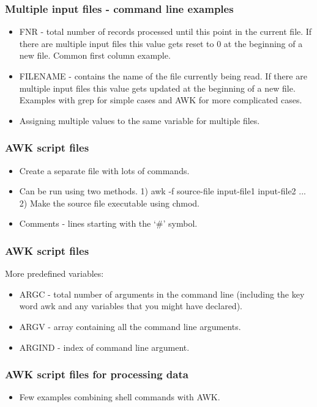 \documentclass[xcolor=svgnames]{beamer}
\begin{document}
\begin{frame}
    \frametitle{Multiple input files - command line examples}
    \begin{itemize}
        \item FNR - total number of records processed until this point in the current file. If there are multiple input files this value gets reset to 0 at the beginning of a new file. Common first column example.
        \item FILENAME - contains the name of the file currently being read. If there are multiple input files this value gets updated at the beginning of a new file. Examples with grep for simple cases and AWK for more complicated cases.
        \item Assigning multiple values to the same variable for multiple files.
    \end{itemize}
\end{frame}
\begin{frame}
    \frametitle{AWK script files}
    \begin{itemize}
        \item Create a separate file with lots of commands.
        \item Can be run using two methods. 1) awk -f source-file input-file1 input-file2 ... 2) Make the source file executable using chmod.
        \item Comments - lines starting with the `\#' symbol.
    \end{itemize}
\end{frame}
\begin{frame}
    \frametitle{AWK script files}
    More predefined variables:
    \begin{itemize}
        \item ARGC - total number of arguments in the command line (including the key word awk and any variables that you might have declared).
        \item ARGV - array containing all the command line arguments.
        \item ARGIND - index of command line argument.
    \end{itemize}
\end{frame}
\begin{frame}
    \frametitle{AWK script files for processing data}
    \begin{itemize}
        \item Few examples combining shell commands with AWK.
    \end{itemize}
\end{frame}
\end{document}
